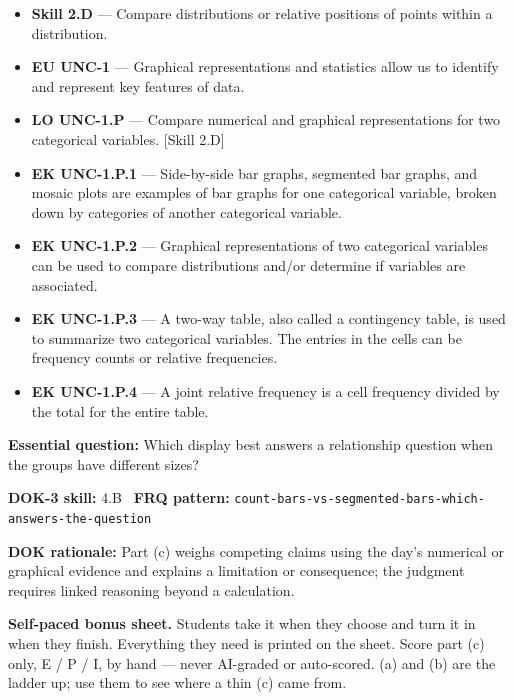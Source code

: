 \documentclass[11pt]{article}
\begin{document}


{\small
\begin{itemize}[leftmargin=1.5em,itemsep=2pt,topsep=2pt]
  \item \textbf{Skill 2.D} --- Compare distributions or relative positions of points within a distribution.
  \item \textbf{EU UNC-1} --- Graphical representations and statistics allow us to identify and represent key features of data.
  \item \textbf{LO UNC-1.P} --- Compare numerical and graphical representations for two categorical variables. [Skill 2.D]
  \item \textbf{EK UNC-1.P.1} --- Side-by-side bar graphs, segmented bar graphs, and mosaic plots are examples of bar graphs for one categorical variable, broken down by categories of another categorical variable.
  \item \textbf{EK UNC-1.P.2} --- Graphical representations of two categorical variables can be used to compare distributions and/or determine if variables are associated.
  \item \textbf{EK UNC-1.P.3} --- A two-way table, also called a contingency table, is used to summarize two categorical variables. The entries in the cells can be frequency counts or relative frequencies.
  \item \textbf{EK UNC-1.P.4} --- A joint relative frequency is a cell frequency divided by the total for the entire table.
\end{itemize}
}
\textbf{Essential question:} Which display best answers a relationship question when the groups have different sizes?\par
\textbf{DOK-3 skill:} 4.B \textperiodcentered\ \textbf{FRQ pattern:} {\small\texttt{count-\allowbreak{}bars-\allowbreak{}vs-\allowbreak{}segmented-\allowbreak{}bars-\allowbreak{}which-\allowbreak{}answers-\allowbreak{}the-\allowbreak{}question}}\par
\textbf{DOK rationale:} Part (c) weighs competing claims using the day's numerical or graphical evidence and explains a limitation or consequence; the judgment requires linked reasoning beyond a calculation.\par

\textbf{Self-paced bonus sheet.} Students take it when they choose and turn it in when they finish. Everything they need is printed on the sheet. Score part (c) only, E / P / I, by hand --- never AI-graded or auto-scored. (a) and (b) are the ladder up; use them to see where a thin (c) came from.\par
\end{document}
